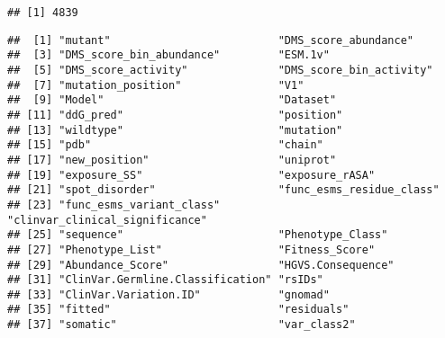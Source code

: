 \documentclass[
]{article}
\newenvironment{Shaded}{\begin{snugshade}}{\end{snugshade}}
\newcommand{\FunctionTok}[1]{\textcolor[rgb]{0.13,0.29,0.53}{\textbf{#1}}}
\newcommand{\NormalTok}[1]{#1}
\newcommand{\OtherTok}[1]{\textcolor[rgb]{0.56,0.35,0.01}{#1}}
\newcommand{\SpecialCharTok}[1]{\textcolor[rgb]{0.81,0.36,0.00}{\textbf{#1}}}
\newcommand{\StringTok}[1]{\textcolor[rgb]{0.31,0.60,0.02}{#1}}
\begin{document}
\begin{verbatim}
## [1] 4839
\end{verbatim}

\begin{Shaded}
\end{Shaded}

\begin{verbatim}
##  [1] "mutant"                          "DMS_score_abundance"            
##  [3] "DMS_score_bin_abundance"         "ESM.1v"                         
##  [5] "DMS_score_activity"              "DMS_score_bin_activity"         
##  [7] "mutation_position"               "V1"                             
##  [9] "Model"                           "Dataset"                        
## [11] "ddG_pred"                        "position"                       
## [13] "wildtype"                        "mutation"                       
## [15] "pdb"                             "chain"                          
## [17] "new_position"                    "uniprot"                        
## [19] "exposure_SS"                     "exposure_rASA"                  
## [21] "spot_disorder"                   "func_esms_residue_class"        
## [23] "func_esms_variant_class"         "clinvar_clinical_significance"  
## [25] "sequence"                        "Phenotype_Class"                
## [27] "Phenotype_List"                  "Fitness_Score"                  
## [29] "Abundance_Score"                 "HGVS.Consequence"               
## [31] "ClinVar.Germline.Classification" "rsIDs"                          
## [33] "ClinVar.Variation.ID"            "gnomad"                         
## [35] "fitted"                          "residuals"                      
## [37] "somatic"                         "var_class2"
\end{verbatim}
\end{document}
